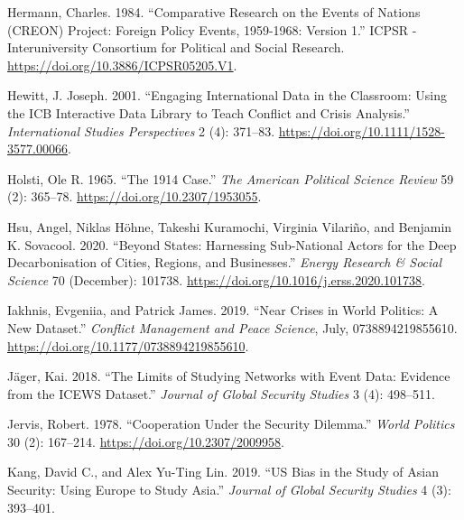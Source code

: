 \documentclass{article}
\newlength{\cslhangindent}
\newlength{\cslentryspacingunit} %
\newenvironment{CSLReferences}[2] %
 {%
  \setlength{\parindent}{0pt}
  \ifodd #1
  \let\oldpar\par
  \def\par{\hangindent=\cslhangindent\oldpar}
  \fi
  \setlength{\parskip}{#2\cslentryspacingunit}
 }%
 {}
\begin{document}
\begin{CSLReferences}{1}{0}
\leavevmode{}%
Hermann, Charles. 1984. {``Comparative {Research} on the {Events} of
{Nations} ({CREON}) {Project}: {Foreign Policy Events}, 1959-1968:
{Version} 1.''} {ICPSR - Interuniversity Consortium for Political and
Social Research}. \url{https://doi.org/10.3886/ICPSR05205.V1}.

\leavevmode{}%
Hewitt, J. Joseph. 2001. {``Engaging {International Data} in the
{Classroom}: {Using} the {ICB Interactive Data Library} to {Teach
Conflict} and {Crisis Analysis}.''} \emph{International Studies
Perspectives} 2 (4): 371--83.
\url{https://doi.org/10.1111/1528-3577.00066}.

\leavevmode{}%
Holsti, Ole R. 1965. {``The 1914 {Case}.''} \emph{The American Political
Science Review} 59 (2): 365--78. \url{https://doi.org/10.2307/1953055}.

\leavevmode{}%
Hsu, Angel, Niklas Höhne, Takeshi Kuramochi, Virginia Vilariño, and
Benjamin K. Sovacool. 2020. {``Beyond States: {Harnessing} Sub-National
Actors for the Deep Decarbonisation of Cities, Regions, and
Businesses.''} \emph{Energy Research \& Social Science} 70 (December):
101738. \url{https://doi.org/10.1016/j.erss.2020.101738}.

\leavevmode{}%
Iakhnis, Evgeniia, and Patrick James. 2019. {``Near Crises in World
Politics: {A} New Dataset.''} \emph{Conflict Management and Peace
Science}, July, 0738894219855610.
\url{https://doi.org/10.1177/0738894219855610}.

\leavevmode{}%
Jäger, Kai. 2018. {``The {Limits} of {Studying Networks} with {Event
Data}: {Evidence} from the {ICEWS Dataset}.''} \emph{Journal of Global
Security Studies} 3 (4): 498--511.

\leavevmode{}%
Jervis, Robert. 1978. {``Cooperation {Under} the {Security Dilemma}.''}
\emph{World Politics} 30 (2): 167--214.
\url{https://doi.org/10.2307/2009958}.

\leavevmode{}%
Kang, David C., and Alex Yu-Ting Lin. 2019. {``{US} Bias in the Study of
{Asian} Security: {Using Europe} to Study {Asia}.''} \emph{Journal of
Global Security Studies} 4 (3): 393--401.


\end{CSLReferences}
\end{document}
